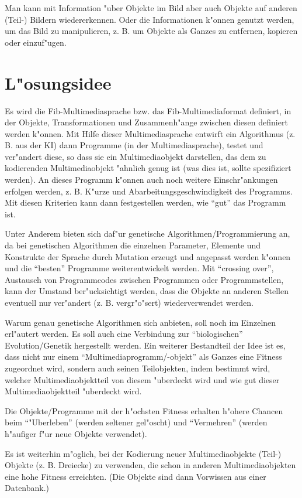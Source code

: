 \documentclass[11pt,a4paper]{article}
\begin{document}
Man kann mit Information "uber Objekte im Bild aber auch Objekte auf anderen (Teil-) Bildern wiedererkennen. Oder die Informationen k"onnen genutzt werden, um das Bild zu manipulieren, z. B. um Objekte als Ganzes zu entfernen, kopieren oder einzuf"ugen.


\section{L"osungsidee}
\label{secSolution}

Es wird die Fib-Multimediasprache bzw. das Fib-Multimediaformat definiert, in der Objekte, Transformationen und Zusammenh"ange zwischen diesen definiert werden k"onnen. Mit Hilfe dieser Multimediasprache entwirft ein Algorithmus (z. B. aus der KI) dann Programme (in der Multimediasprache), testet und ver"andert diese, so dass sie ein Multimediaobjekt darstellen, das dem zu kodierenden Multimediaobjekt "ahnlich genug ist (was dies ist, sollte spezifiziert werden). An dieses Programm k"onnen auch noch weitere Einschr"ankungen erfolgen werden, z. B. K"urze und Abarbeitungsgeschwindigkeit des Programms. Mit diesen Kriterien kann dann festgestellen werden, wie ``gut'' das Programm ist.

Unter Anderem bieten sich daf"ur genetische Algorithmen/Programmierung an, da bei genetischen Algorithmen die einzelnen Parameter, Elemente und Konstrukte der Sprache durch Mutation erzeugt und angepasst werden k"onnen und die ``besten'' Programme weiterentwickelt werden. Mit ``crossing over'', Austausch von Programmcodes zwischen Programmen oder Programmstellen, kann der Umstand ber"ucksichtigt werden, dass die Objekte an anderen Stellen eventuell nur ver"andert (z. B. vergr"o"sert) wiederverwendet werden.

Warum genau genetische Algorithmen sich anbieten, soll noch im Einzelnen erl"autert werden. Es soll auch eine Verbindung zur ``biologischen'' Evolution/Genetik hergestellt werden.
Ein weiterer Bestandteil der Idee ist es, dass nicht nur einem ``Multimediaprogramm/-objekt'' als Ganzes eine Fitness zugeordnet wird, sondern auch seinen Teilobjekten, indem bestimmt wird, welcher Multimediaobjektteil von diesem "uberdeckt wird und wie gut dieser Multimediaobjektteil "uberdeckt wird. 

Die Objekte/Programme mit der h"ochsten Fitness erhalten h"ohere Chancen beim ``"Uberleben'' (werden seltener gel"oscht) und ``Vermehren'' (werden h"aufiger f"ur neue Objekte verwendet).

Es ist weiterhin m"oglich, bei der Kodierung neuer Multimediaobjekte (Teil-) Objekte (z. B. Dreiecke) zu verwenden, die schon in anderen Multimediaobjekten eine hohe Fitness erreichten. (Die Objekte sind dann Vorwissen aus einer Datenbank.)
\end{document}

